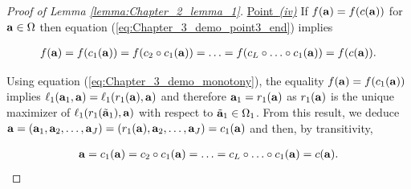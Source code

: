\documentclass[
]{jss}
\begin{document}
\begin{proof}[Proof of Lemma \ref{lemma:Chapter_2_lemma_1}]
    \underline{Point~\textit{(iv)}} 
    If $f(\mathbf{a}) = f(c(\mathbf{a}))$ for $\mathbf{a} \in \Omega$ then equation (\ref{eq:Chapter_3_demo_point3_end}) implies 

    \begin{equation}
        \begin{gathered}
            f(\mathbf{a})= f(c_1(\mathbf{a}))= f(c_2\circ c_1(\mathbf{a}))=\ldots= f(c_L\circ\ldots\circ c_1(\mathbf{a})) = f(c(\mathbf{a})).
        \end{gathered}
    \end{equation}

    Using equation (\ref{eq:Chapter_3_demo_monotony}), the equality $f(\mathbf{a}) = f(c_1(\mathbf{a}))$ implies $\ell_1(\mathbf{a}_1, \mathbf{a})=\ell_1(r_1(\mathbf{a}), \mathbf{a})$ and therefore $\mathbf{a}_1=r_1(\mathbf{a})$ as $r_1(\mathbf{a})$ is the unique maximizer of $\ell_1(r_1(\tilde{\mathbf{a}}_1), \mathbf{a})$ with respect to $\tilde{\mathbf{a}}_1 \in \Omega_1$. From this result, we deduce $\mathbf{a} = \left(\mathbf{a}_1, \mathbf{a}_2, \ldots, \mathbf{a}_J \right) = \left(r_1(\mathbf{a}), \mathbf{a}_2, \ldots, \mathbf{a}_J \right) = c_1(\mathbf{a})$ and then, by transitivity, 

    \begin{equation}
        \begin{gathered}
            \mathbf{a}= c_1(\mathbf{a})= c_2\circ c_1(\mathbf{a})=\ldots= c_L\circ\ldots\circ c_1(\mathbf{a}) = c(\mathbf{a}).
        \end{gathered}
    \end{equation}

\end{proof}
\end{document}
